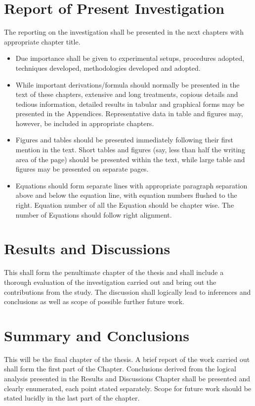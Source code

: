 \section{Report of Present Investigation}
The reporting on the investigation shall be presented in the next chapters with appropriate chapter title.
\begin{itemize}
	\item 	Due importance shall be given to experimental setups, procedures adopted, techniques developed, methodologies developed and adopted.
	\item  While important derivations/formula should normally be presented in the text of these chapters, extensive and long treatments, copious details and tedious information, detailed results in tabular and graphical forms may be presented in the Appendices. Representative data in table and figures may, however, be included in appropriate chapters.
	\item  Figures and tables should be presented immediately following their first mention in the text. Short tables and figures (say, less than half the writing area of the page) should be presented within the text, while large table and figures may be presented on separate pages.
	\item  Equations should form separate lines with appropriate paragraph separation above and below the equation line, with equation numbers flushed to the right. Equation number of all the Equation should be chapter wise. The number of Equations should follow right alignment.
\end{itemize}
\section{Results and Discussions}
This shall form the penultimate chapter of the thesis and shall include a thorough evaluation of the investigation carried out and bring out the contributions from the study. The discussion shall logically lead to inferences and conclusions as well as scope of possible further future work.
\section{Summary and Conclusions}
This will be the final chapter of the thesis. A brief report of the work carried out shall form the first part of the Chapter. Conclusions derived from the logical analysis presented in the Results and Discussions Chapter shall be presented and clearly enumerated, each point stated separately. Scope for future work should be stated lucidly in the last part of the chapter.
